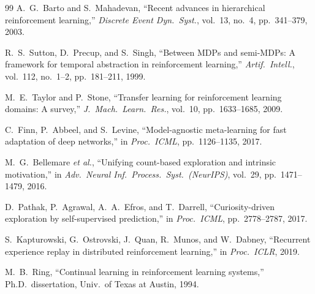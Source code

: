 \documentclass[10pt,conference]{IEEEtran}
\begin{document}
\begin{thebibliography}{99}
A.~G.\ Barto and S.\ Mahadevan,
``Recent advances in hierarchical reinforcement learning,''
\emph{Discrete Event Dyn.\ Syst.}, vol.~13, no.~4, pp.~341--379, 2003.

R.~S.\ Sutton, D.\ Precup, and S.\ Singh,
``Between MDPs and semi-MDPs: A framework for temporal abstraction
in reinforcement learning,''
\emph{Artif.\ Intell.}, vol.~112, no.~1--2, pp.~181--211, 1999.

M.~E.\ Taylor and P.\ Stone,
``Transfer learning for reinforcement learning domains: A survey,''
\emph{J.\ Mach.\ Learn.\ Res.}, vol.~10, pp.~1633--1685, 2009.

C.~Finn, P.\ Abbeel, and S.\ Levine,
``Model-agnostic meta-learning for fast adaptation of deep networks,''
in \emph{Proc.\ ICML}, pp.~1126--1135, 2017.

M.~G.\ Bellemare \emph{et al.},
``Unifying count-based exploration and intrinsic motivation,''
in \emph{Adv.\ Neural Inf.\ Process.\ Syst.\ (NeurIPS)},
vol.~29, pp.~1471--1479, 2016.

D.~Pathak, P.\ Agrawal, A.~A.\ Efros, and T.\ Darrell,
``Curiosity-driven exploration by self-supervised prediction,''
in \emph{Proc.\ ICML}, pp.~2778--2787, 2017.

S.~Kapturowski, G.\ Ostrovski, J.\ Quan, R.\ Munos,
and W.\ Dabney,
``Recurrent experience replay in distributed reinforcement learning,''
in \emph{Proc.\ ICLR}, 2019.

M.~B.\ Ring,
``Continual learning in reinforcement learning systems,''
Ph.D.\ dissertation, Univ.\ of Texas at Austin, 1994.

\end{thebibliography}
\end{document}
